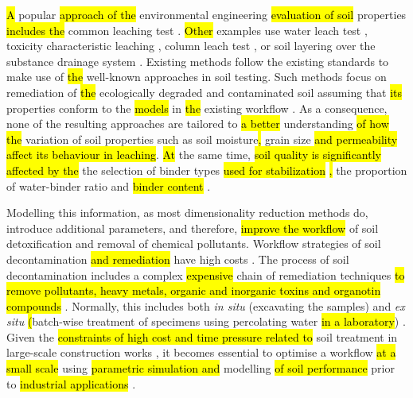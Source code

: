 \documentclass[algorithms,article,submit,pdftex,moreauthors]{Definitions/mdpi}
\begin{document}
\hl{A }popular \hl{approach of the }environmental engineering \hl{evaluation of soil} properties\hl{ includes the} common leaching test\hl{ }\cite{Chittoori,Beauchesne,Lemenkova202233}. \hl{Other} examples use water leach test \cite{Schreck,Becker},\hl{ }toxicity characteristic leaching\hl{ }\cite{Fuessle},\hl{ }column leach test \cite{Dayioglu,Sauer}, or soil layering over the substance drainage system \cite{Yu}. Existing methods follow the existing standards to make use of \hl{the }well-known approaches in soil testing. Such\hl{ }methods focus on remediation of \hl{the }ecologically degraded and contaminated soil assuming that \hl{its} properties conform to the \hl{models} in \hl{the }existing workflow \cite{Alpaslan,ma16093444,su15064950}. As a consequence, none of the resulting approaches are tailored to \hl{a better }understanding \hl{of how the} variation of soil properties\hl{ }such as soil moisture\hl{, }grain size\hl{ and permeability affect its behaviour in leaching}. \hl{At} the same time, \hl{soil quality is significantly affected by the }the selection of binder types \hl{used for stabilization }\cite{Paniagua,TONINIDEARAUJO2023129757,Filho}\hl{, }the proportion of water-binder ratio \cite{Kukko} and \hl{binder content} \cite{Lametal2018}. 

Modelling this information, as most dimensionality reduction methods do,\hl{ }introduce additional parameters, and therefore, \hl{improve the workflow }of soil detoxification and removal of chemical pollutants. Workflow strategies of soil decontamination \hl{and remediation }have high costs \cite{Ghavami,Mishra,Lu}. The process of soil decontamination includes a complex \hl{expensive }chain of remediation techniques \hl{to remove pollutants, heavy metals, organic and inorganic toxins and organotin compounds} \cite{Agarwal,DU2014141,SARKER2023138861}. Normally, this includes both \emph{in situ} (excavating the samples) and \emph{ex situ} \hl{(}batch-wise treatment of specimens using percolating water \hl{in a laboratory}) \cite{LU2023130021,CHEN2010638,KAVAMURA201061}. Given the \hl{constraints of high cost and time pressure related to }soil treatment in large-scale\hl{ }construction works \cite{ChenLi,recycling1030328,Ahmed}, it becomes essential to optimise a workflow \hl{at a small scale }using \hl{parametric simulation and} modelling \hl{of soil performance }prior to \hl{industrial applications} \cite{7733108}.  
\end{document}
